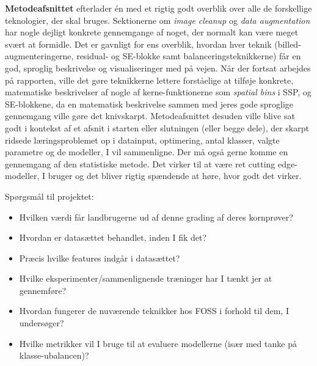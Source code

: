 \documentclass[12pt,fleqn,]{article}
\begin{document}
\textbf{Metodeafsnittet} efterlader én med et rigtig godt overblik over alle de forskellige teknologier, der skal bruges. Sektionerne om \textit{image cleanup} og \textit{data augmentation} har nogle dejligt konkrete gennemgange af noget, der normalt kan være meget svært at formidle. Det er gavnligt for ens overblik, hvordan hver teknik (billed-augmenteringerne, residual- og SE-blokke samt balanceringsteknikkerne) får en god, sproglig beskrivelse og visualiseringer med på vejen. Når der fortsat arbejdes på rapporten, ville det gøre teknikkerne lettere forståelige at tilføje konkrete, matematiske beskrivelser af nogle af kerne-funktionerne som \textit{spatial bins} i SSP, og SE-blokkene, da en matematisk beskrivelse sammen med jeres gode sproglige gennemgang ville gøre det knivskarpt. Metodeafsnittet desuden ville blive sat godt i kontekst af et afsnit i starten eller slutningen (eller begge dele), der skarpt ridsede læringsproblemet op i datainput, optimering, antal klasser, valgte parametre og de modeller, I vil sammenligne. Der må også gerne komme en gennemgang af den statistiske metode. Det virker til at være ret cutting edge-modeller, I bruger og det bliver rigtig spændende at høre, hvor godt det virker. 
\

Spørgsmål til projektet:
\begin{itemize}

\item Hvilken værdi får landbrugerne ud af denne grading af deres kornprøver? 
\item Hvordan er datasættet behandlet, inden I fik det?
\item Præcis hvilke features indgår i datasættet?   
\item Hvilke eksperimenter/sammenlignende træninger har I tænkt jer at gennemføre?
\item Hvordan fungerer de nuværende teknikker hos FOSS i forhold til dem, I undersøger?
\item Hvilke metrikker vil I bruge til at evaluere modellerne (især med tanke på klasse-ubalancen)?

\end{itemize}
\end{document}
